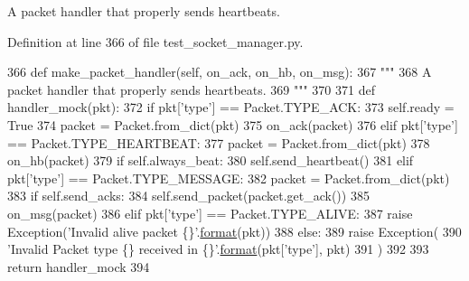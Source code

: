 \begin{DoxyVerb}A packet handler that properly sends heartbeats.
\end{DoxyVerb}
 

Definition at line 366 of file test\+\_\+socket\+\_\+manager.\+py.


\begin{DoxyCode}
366     \textcolor{keyword}{def }make\_packet\_handler(self, on\_ack, on\_hb, on\_msg):
367         \textcolor{stringliteral}{"""}
368 \textcolor{stringliteral}{        A packet handler that properly sends heartbeats.}
369 \textcolor{stringliteral}{        """}
370 
371         \textcolor{keyword}{def }handler\_mock(pkt):
372             \textcolor{keywordflow}{if} pkt[\textcolor{stringliteral}{'type'}] == Packet.TYPE\_ACK:
373                 self.ready = \textcolor{keyword}{True}
374                 packet = Packet.from\_dict(pkt)
375                 on\_ack(packet)
376             \textcolor{keywordflow}{elif} pkt[\textcolor{stringliteral}{'type'}] == Packet.TYPE\_HEARTBEAT:
377                 packet = Packet.from\_dict(pkt)
378                 on\_hb(packet)
379                 \textcolor{keywordflow}{if} self.always\_beat:
380                     self.send\_heartbeat()
381             \textcolor{keywordflow}{elif} pkt[\textcolor{stringliteral}{'type'}] == Packet.TYPE\_MESSAGE:
382                 packet = Packet.from\_dict(pkt)
383                 \textcolor{keywordflow}{if} self.send\_acks:
384                     self.send\_packet(packet.get\_ack())
385                 on\_msg(packet)
386             \textcolor{keywordflow}{elif} pkt[\textcolor{stringliteral}{'type'}] == Packet.TYPE\_ALIVE:
387                 \textcolor{keywordflow}{raise} Exception(\textcolor{stringliteral}{'Invalid alive packet \{\}'}.\hyperlink{namespaceparlai_1_1chat__service_1_1services_1_1messenger_1_1shared__utils_a32e2e2022b824fbaf80c747160b52a76}{format}(pkt))
388             \textcolor{keywordflow}{else}:
389                 \textcolor{keywordflow}{raise} Exception(
390                     \textcolor{stringliteral}{'Invalid Packet type \{\} received in \{\}'}.\hyperlink{namespaceparlai_1_1chat__service_1_1services_1_1messenger_1_1shared__utils_a32e2e2022b824fbaf80c747160b52a76}{format}(pkt[\textcolor{stringliteral}{'type'}], pkt)
391                 )
392 
393         \textcolor{keywordflow}{return} handler\_mock
394 
\end{DoxyCode}
\mbox{\label{classparlai_1_1mturk_1_1core_1_1test_1_1test__socket__manager_1_1MockAgent_acb9b096d3f537b0b28b535b387a86967}} 
